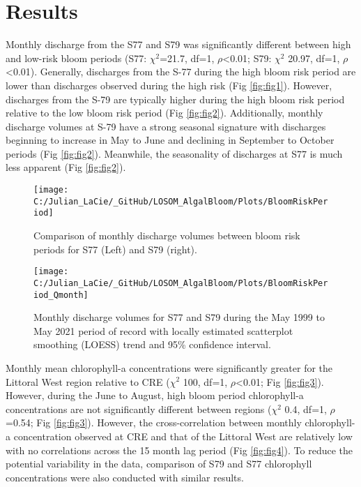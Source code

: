 \documentclass[]{interact}
\theoremstyle{plain}%
\theoremstyle{definition}
\theoremstyle{remark}
\begin{document}
\hypertarget{results}{%
\section{Results}\label{results}}

Monthly discharge from the S77 and S79 was significantly different
between high and low-risk bloom periods (S77: \(\chi^{2}\)=21.7, df=1,
\(\rho\)\textless0.01; S79: \(\chi^{2}\) 20.97, df=1,
\(\rho\)\textless0.01). Generally, discharges from the S-77 during the
high bloom risk period are lower than discharges observed during the
high risk (Fig \ref{fig:fig1}). However, discharges from the S-79 are
typically higher during the high bloom risk period relative to the low
bloom risk period (Fig \ref{fig:fig2}). Additionally, monthly discharge
volumes at S-79 have a strong seasonal signature with discharges
beginning to increase in May to June and declining in September to
October periods (Fig \ref{fig:fig2}). Meanwhile, the seasonality of
discharges at S77 is much less apparent (Fig \ref{fig:fig2}).

\begin{figure}[H]
\texttt{[image: C:/Julian\_LaCie/\_GitHub/LOSOM\_AlgalBloom/Plots/BloomRiskPeriod]} \caption{\label{fig:fig1} Comparison of monthly discharge volumes between bloom risk periods for S77 (Left) and S79 (right).}\label{fig:unnamed-chunk-3}
\end{figure}

\begin{figure}[H]
\texttt{[image: C:/Julian\_LaCie/\_GitHub/LOSOM\_AlgalBloom/Plots/BloomRiskPeriod\_Qmonth]} \caption{\label{fig:fig2} Monthly discharge volumes for S77 and S79 during the May 1999 to May 2021 period of record with locally estimated scatterplot smoothing (LOESS) trend and 95\% confidence interval.}\label{fig:unnamed-chunk-4}
\end{figure}

Monthly mean chlorophyll-a concentrations were significantly greater for
the Littoral West region relative to CRE (\(\chi^{2}\) 100, df=1,
\(\rho\)\textless0.01; Fig \ref{fig:fig3}). However, during the June to
August, high bloom period chlorophyll-a concentrations are not
significantly different between regions (\(\chi^{2}\) 0.4, df=1,
\(\rho\)=0.54; Fig \ref{fig:fig3}). However, the cross-correlation
between monthly chlorophyll-a concentration observed at CRE and that of
the Littoral West are relatively low with no correlations across the 15
month lag period (Fig \ref{fig:fig4}). To reduce the potential
variability in the data, comparison of S79 and S77 chlorophyll
concentrations were also conducted with similar results.
\end{document}
